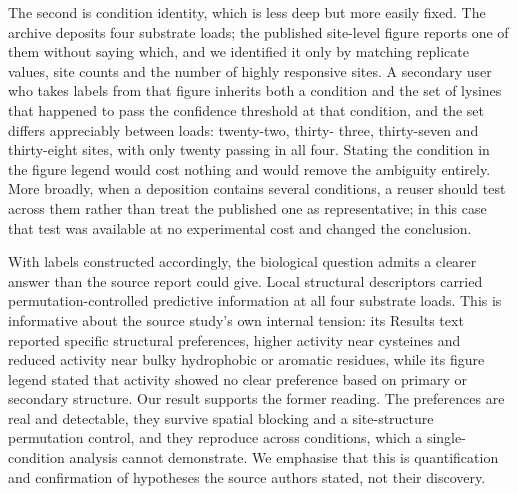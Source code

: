 \documentclass[journal=jprobs,manuscript=article,layout=traditional]{achemso}
\begin{document}
The second is condition identity, which is less deep but more easily fixed. The archive deposits four substrate loads; the published site-level figure reports one of them without saying which, and we identified it only by matching replicate values, site counts and the number of highly responsive sites. A secondary user who takes labels from that figure inherits both a condition and the set of lysines that happened to pass the confidence threshold at that condition, and the set differs appreciably between loads: twenty-two, thirty- three, thirty-seven and thirty-eight sites, with only twenty passing in all four. Stating the condition in the figure legend would cost nothing and would remove the ambiguity entirely. More broadly, when a deposition contains several conditions, a reuser should test across them rather than treat the published one as representative; in this case that test was available at no experimental cost and changed the conclusion.

With labels constructed accordingly, the biological question admits a clearer answer than the source report could give. Local structural descriptors carried permutation-controlled predictive information at all four substrate loads. This is informative about the source study's own internal tension: its Results text reported specific structural preferences, higher activity near cysteines and reduced activity near bulky hydrophobic or aromatic residues, while its figure legend stated that activity showed no clear preference based on primary or secondary structure. Our result supports the former reading. The preferences are real and detectable, they survive spatial blocking and a site-structure permutation control, and they reproduce across conditions, which a single-condition analysis cannot demonstrate. We emphasise that this is quantification and confirmation of hypotheses the source authors stated, not their discovery.
\end{document}
